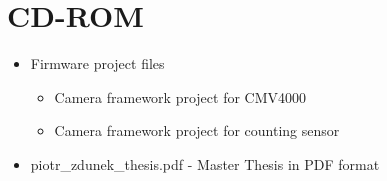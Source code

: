 \chapter{CD-ROM}\label{apndx:CDROM}

\begin{itemize}

    \item Firmware project files 
        \begin{itemize}
            \item Camera framework project for CMV4000
            \item Camera framework project for counting sensor 
        \end{itemize}

    \item piotr\_zdunek\_thesis.pdf - Master Thesis in PDF format

\end{itemize}


\clearpage
\newpage






